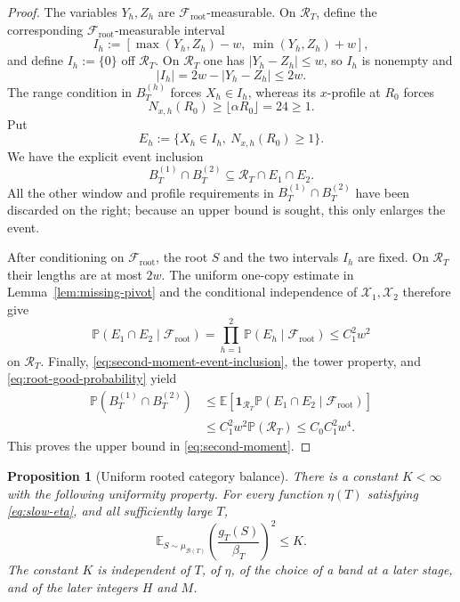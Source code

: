 \documentclass[11pt]{article}
\numberwithin{equation}{section}
\theoremstyle{plain}
\newtheorem{proposition}[theorem]{Proposition}
\newcommand{\Pp}{\mathbb P}
\newcommand{\E}{\mathbb E}
\newcommand{\1}{\mathbf 1}
\newcommand{\cB}{\mathcal B}
\begin{document}
\begin{proof}
The variables $Y_h,Z_h$ are $\mathcal F_{\mathrm{root}}$-measurable.  On
$\mathcal R_T$, define the corresponding
$\mathcal F_{\mathrm{root}}$-measurable interval
\begin{equation}\label{eq:missing-target}
 I_h:=[\max(Y_h,Z_h)-w,\ \min(Y_h,Z_h)+w],
\end{equation}
and define $I_h:=\{0\}$ off $\mathcal R_T$.  On $\mathcal R_T$ one has
$|Y_h-Z_h|\le w$, so $I_h$ is nonempty and
\[
 |I_h|=2w-|Y_h-Z_h|\le2w.
\]
The range condition in $B_T^{(h)}$ forces $X_h\in I_h$, whereas its
$x$-profile at $R_0$ forces
\[
 N_{x,h}(R_0)\ge\lfloor\alpha R_0\rfloor=24\ge1.
\]
Put
\[
 E_h:=\{X_h\in I_h,\ N_{x,h}(R_0)\ge1\}.
\]
We have the explicit event inclusion
\begin{equation}\label{eq:second-moment-event-inclusion}
 B_T^{(1)}\cap B_T^{(2)}
 \subseteq\mathcal R_T\cap E_1\cap E_2.
\end{equation}
All the other window and profile requirements in
$B_T^{(1)}\cap B_T^{(2)}$ have been discarded on the right; because an
upper bound is sought, this only enlarges the event.

After conditioning on $\mathcal F_{\mathrm{root}}$, the root $S$ and the
two intervals $I_h$ are fixed.  On $\mathcal R_T$ their lengths are at
most $2w$.  The uniform one-copy estimate in
Lemma~\ref{lem:missing-pivot} and the conditional independence of
$\mathcal X_1,\mathcal X_2$ therefore give
\[
 \Pp(E_1\cap E_2\mid\mathcal F_{\mathrm{root}})
 =\prod_{h=1}^2
   \Pp(E_h\mid\mathcal F_{\mathrm{root}})
 \le C_1^2w^2
\]
on $\mathcal R_T$.  Finally,
\eqref{eq:second-moment-event-inclusion}, the tower property, and
\eqref{eq:root-good-probability} yield
\begin{align*}
 \Pp(B_T^{(1)}\cap B_T^{(2)})
 &\le
 \E\!\left[
  \1_{\mathcal R_T}
  \Pp(E_1\cap E_2\mid\mathcal F_{\mathrm{root}})
 \right]\\
 &\le C_1^2w^2\Pp(\mathcal R_T)
 \le C_0C_1^2w^4.
\end{align*}
This proves the upper bound in \eqref{eq:second-moment}.
\end{proof}

\begin{proposition}[Uniform rooted category balance]
\label{prop:rooted-balance}
There is a constant $K<\infty$ with the following uniformity property.
For every function $\eta(T)$ satisfying \eqref{eq:slow-eta}, and all
sufficiently large $T$,
\begin{equation}\label{eq:rooted-L2}
 \E_{S\sim\mu_{\cB(T)}}
 \left(\frac{g_T(S)}{\beta_T}\right)^2
 \le K.
\end{equation}
The constant $K$ is independent of $T$, of $\eta$, of the choice of a band
at a later stage, and of the later integers $H$ and $M$.
\end{proposition}
\end{document}
